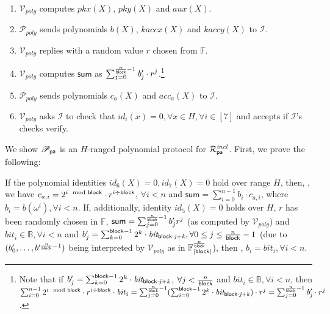 \begin{enumerate}
\item $\mathcal{V}_{poly}$ computes $pkx(X)$, $pky(X)$ and $aux(X)$.
\item $\mathcal{P}_{poly}$ sends polynomials $b(X)$, $kaccx(X)$ and $kaccy(X)$ to $\mathcal{I}$. 
\item $\mathcal{V}_{poly}$ replies with a random value $r$ chosen from $\mathbb{F}$. 
\item $\mathcal{V}_{poly}$ computes $\mathsf{sum}$ as $\sum_{j=0}^{\frac{n}{\mathsf{block}}-1} \mathit{b'_{j}} \cdot r^j$.\footnote{Note that if 
$b'_{j} = \sum_{k=0}^{\mathsf{block} -1}2^k \cdot \mathit{bit_{\mathsf{block} \cdot j + k }}$, $\forall j < \frac{n}{\mathsf{block}}$ and $\mathit{bit_i} \in \mathbb{B}, \forall i <n$, 
then $\sum_{i=0}^{n-1} 2^{i \mod {\mathsf{block}}} \cdot r^{i \div \mathsf{block}} \cdot \mathit{bit}_{i} = \sum_{j=0}^{\frac{n}{\mathsf{block}}-1}(\sum_{i=0}^{\mathsf{block} -1}2^k \cdot \mathit{bit_{\mathsf{block} \cdot j + k }}) \cdot r^j= \sum_{j=0}^{\frac{n}{\mathsf{block}}-1} \mathit{b'_{j}} \cdot r^j$.}
\item $\mathcal{P}_{poly}$ sends polynomials $c_{a}(X)$ and $acc_{a}(X)$ to $\mathcal{I}$. 
\item $\mathcal{V}_{poly}$ asks $\mathcal{I}$ to check that $id_i(x) = 0, \forall x \in H, \forall i \in [7]$ and accepts if $\mathcal{I}$'s checks verify. 
\end{enumerate}

\noindent We show $\mathscr{P}_{\mathsf{pa}}$ is an $H$-ranged polynomial protocol 
for $\mathcal{R}^{\mathit{incl}}_{\mathsf{pa}}$. First, we prove the following:

\begin{test_claim}
\label{claim:bitvector_comm}
If the polynomial identities $id_6(X) = 0, id_7(X) = 0$ hold over range $H$, then, 
\ewnp, 
we have $c_{a,i} =  2^{i \mod {\mathsf{block}}} \cdot r^{i \div \mathsf{block}}$, $\forall i < n$ and $\mathsf{sum} = \sum_{i=0}^{n-1}b_i \cdot c_{a,i}$, 
where $b_i = b(\omega^i), \forall i <n$. If, additionally, identity $id_5(X) = 0$ holds over $H$, 
$r$ has been randomly chosen in $\mathbb{F}$, $\mathsf{sum} = \sum_{j=0}^{\frac{n}{\mathsf{block}}-1} b'_{j}r^j$ 
(as computed by $\mathcal{V}_{poly}$) and $\mathit{bit_{i}} \in \mathbb{B}, \forall i < n$ and 
$b'_{j} = \sum_{k=0}^{\mathsf{block} -1}2^k \cdot \mathit{bit_{\mathsf{block} \cdot j + k}}, \forall 0 \leq j \leq \frac{n}{\mathsf{block}} -1$ 
(due to  $(b'_{0}, \ldots, b'^{\frac{n}{\mathsf{block}} -1})$ 
being interpreted by $\mathcal{V}_{poly}$ as in $\mathbb{F}_{|\mathsf{block}|}^{\frac{n}{\mathsf{block}}}$), then \ewnp, 
$b_i = \mathit{bit_{i}}, \forall i <n$.
\end{test_claim}
\vspace{-0.15in}

